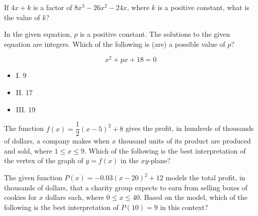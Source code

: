If $4x + k$ is a factor of $8x^3 - 26x^2 - 24x$, where $k$ is a positive constant, what is the value of $k$?

\vspace{2em}

\noindent\markforreview
\vspace{1em}

In the given equation, $p$ is a positive constant. The solutions to the given equation are integers. Which of the following is (are) a possible value of $p$?

\[
x^2 + px + 18 = 0
\]

\vspace{0.5em}

\begin{itemize}
\item I. 9
\item II. 17
\item III. 19
\end{itemize}

\vspace{0.75em}


\vspace{2em}

\noindent\markforreview
\vspace{1em}

The function $f(x) = \dfrac{1}{2}(x - 5)^2 + 8$ gives the profit, in hundreds of thousands of dollars, a company makes when $x$ thousand units of its product are produced and sold, where $1 \leq x \leq 9$. Which of the following is the best interpretation of the vertex of the graph of $y = f(x)$ in the $xy$-plane?

\vspace{0.75em}


\vspace{2em}

\noindent\markforreview
\vspace{1em}

The given function $P(x) = -0.03(x - 20)^2 + 12$ models the total profit, in thousands of dollars, that a charity group expects to earn from selling boxes of cookies for $x$ dollars each, where $0 \leq x \leq 40$. Based on the model, which of the following is the best interpretation of $P(10) = 9$ in this context?

